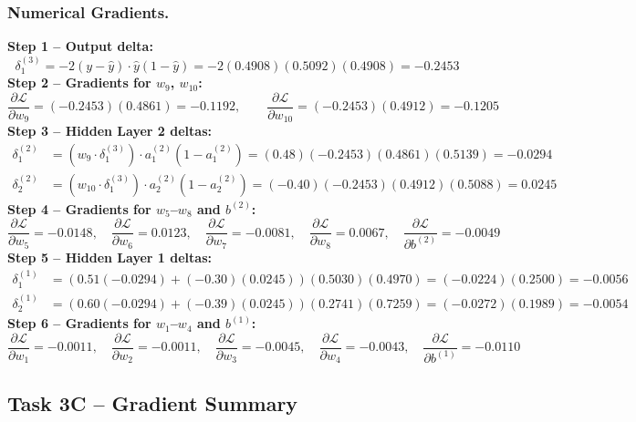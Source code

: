 \documentclass[runningheads]{llncs}
\begin{document}
\subsubsection{Numerical Gradients.}

\noindent\textbf{Step 1 -- Output delta:}
\[
  \delta_1^{(3)} = -2(y-\hat{y})\cdot\hat{y}(1-\hat{y})
  = -2(0.4908)(0.5092)(0.4908) = -0.2453
\]
\textbf{Step 2 -- Gradients for $w_9$, $w_{10}$:}
\[
  \frac{\partial\mathcal{L}}{\partial w_9}
  = (-0.2453)(0.4861) = -0.1192, \qquad
  \frac{\partial\mathcal{L}}{\partial w_{10}}
  = (-0.2453)(0.4912) = -0.1205
\]
\textbf{Step 3 -- Hidden Layer 2 deltas:}
\begin{align*}
  \delta_1^{(2)} &= (w_9\cdot\delta_1^{(3)})\cdot a_1^{(2)}(1-a_1^{(2)})
  = (0.48)(-0.2453)(0.4861)(0.5139) = -0.0294\\
  \delta_2^{(2)} &= (w_{10}\cdot\delta_1^{(3)})\cdot a_2^{(2)}(1-a_2^{(2)})
  = (-0.40)(-0.2453)(0.4912)(0.5088) = 0.0245
\end{align*}
\textbf{Step 4 -- Gradients for $w_5$--$w_8$ and $b^{(2)}$:}
\[
  \frac{\partial\mathcal{L}}{\partial w_5}{=}{-}0.0148,\quad
  \frac{\partial\mathcal{L}}{\partial w_6}{=}0.0123,\quad
  \frac{\partial\mathcal{L}}{\partial w_7}{=}{-}0.0081,\quad
  \frac{\partial\mathcal{L}}{\partial w_8}{=}0.0067,\quad
  \frac{\partial\mathcal{L}}{\partial b^{(2)}}{=}{-}0.0049
\]
\textbf{Step 5 -- Hidden Layer 1 deltas:}
\begin{align*}
  \delta_1^{(1)} &= (0.51(-0.0294)+(-0.30)(0.0245))(0.5030)(0.4970)
  = (-0.0224)(0.2500) = -0.0056\\
  \delta_2^{(1)} &= (0.60(-0.0294)+(-0.39)(0.0245))(0.2741)(0.7259)
  = (-0.0272)(0.1989) = -0.0054
\end{align*}
\textbf{Step 6 -- Gradients for $w_1$--$w_4$ and $b^{(1)}$:}
\[
  \frac{\partial\mathcal{L}}{\partial w_1}{=}{-}0.0011,\quad
  \frac{\partial\mathcal{L}}{\partial w_2}{=}{-}0.0011,\quad
  \frac{\partial\mathcal{L}}{\partial w_3}{=}{-}0.0045,\quad
  \frac{\partial\mathcal{L}}{\partial w_4}{=}{-}0.0043,\quad
  \frac{\partial\mathcal{L}}{\partial b^{(1)}}{=}{-}0.0110
\]

\subsection{Task 3C -- Gradient Summary}
\end{document}
